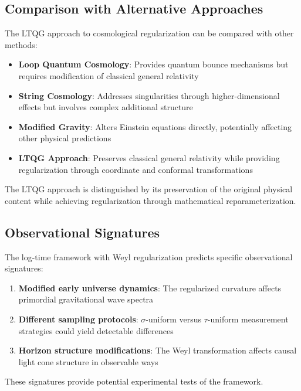 \subsection{Comparison with Alternative Approaches}
\label{subsec:alternative_approaches}

The LTQG approach to cosmological regularization can be compared with other methods:

\begin{itemize}
\item \textbf{Loop Quantum Cosmology}: Provides quantum bounce mechanisms but requires modification of classical general relativity
\item \textbf{String Cosmology}: Addresses singularities through higher-dimensional effects but involves complex additional structure
\item \textbf{Modified Gravity}: Alters Einstein equations directly, potentially affecting other physical predictions
\item \textbf{LTQG Approach}: Preserves classical general relativity while providing regularization through coordinate and conformal transformations
\end{itemize}

The LTQG approach is distinguished by its preservation of the original physical content while achieving regularization through mathematical reparameterization.

\subsection{Observational Signatures}
\label{subsec:observational_signatures}

The log-time framework with Weyl regularization predicts specific observational signatures:

\begin{enumerate}
\item \textbf{Modified early universe dynamics}: The regularized curvature affects primordial gravitational wave spectra
\item \textbf{Different sampling protocols}: $\sigma$-uniform versus $\tau$-uniform measurement strategies could yield detectable differences
\item \textbf{Horizon structure modifications}: The Weyl transformation affects causal light cone structure in observable ways
\end{enumerate}

These signatures provide potential experimental tests of the framework.


